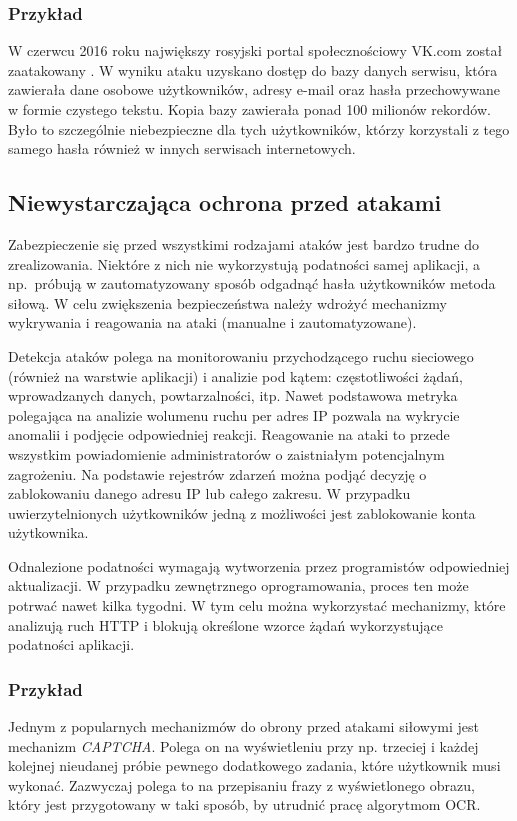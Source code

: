 \documentclass[11pt,a4paper,polish,thesis,oneside]{dcsbook}
\begin{document}
\subsubsection*{Przykład}
W czerwcu 2016 roku największy rosyjski portal społecznościowy VK.com został zaatakowany \cite{vk}. W wyniku ataku uzyskano dostęp do bazy danych serwisu, która zawierała dane osobowe użytkowników, adresy e-mail oraz hasła przechowywane w formie czystego tekstu. Kopia bazy zawierała ponad 100 milionów rekordów. Było to szczególnie niebezpieczne dla tych użytkowników, którzy korzystali z tego samego hasła również w innych serwisach internetowych. 


\subsection{Niewystarczająca ochrona przed atakami}
Zabezpieczenie się przed wszystkimi rodzajami ataków jest bardzo trudne do zrealizowania. Niektóre z nich nie wykorzystują podatności samej aplikacji, a np.~próbują w zautomatyzowany sposób odgadnąć hasła użytkowników metoda siłową. W celu zwiększenia bezpieczeństwa należy wdrożyć mechanizmy wykrywania i reagowania na ataki (manualne i zautomatyzowane).

Detekcja ataków polega na monitorowaniu przychodzącego ruchu sieciowego (również na warstwie aplikacji) i analizie pod kątem: częstotliwości żądań, wprowadzanych danych, powtarzalności, itp. Nawet podstawowa metryka polegająca na analizie wolumenu ruchu per adres IP pozwala na wykrycie anomalii i podjęcie odpowiedniej reakcji. Reagowanie na ataki to przede wszystkim powiadomienie administratorów o zaistniałym potencjalnym zagrożeniu. Na podstawie rejestrów zdarzeń można podjąć decyzję o zablokowaniu danego adresu IP lub całego zakresu. W przypadku uwierzytelnionych użytkowników jedną z możliwości jest zablokowanie konta użytkownika.

Odnalezione podatności wymagają wytworzenia przez programistów odpowiedniej aktualizacji. W przypadku zewnętrznego oprogramowania, proces ten może potrwać nawet kilka tygodni. W tym celu można wykorzystać mechanizmy, które analizują ruch HTTP i blokują określone wzorce żądań wykorzystujące podatności aplikacji.

\subsubsection*{Przykład}
Jednym z popularnych mechanizmów do obrony przed atakami siłowymi jest mechanizm \textit{CAPTCHA}. Polega on na wyświetleniu przy np. trzeciej i każdej kolejnej nieudanej próbie pewnego dodatkowego zadania, które użytkownik musi wykonać. Zazwyczaj polega to na przepisaniu frazy z wyświetlonego obrazu, który jest przygotowany w taki sposób, by utrudnić pracę algorytmom OCR. 
\end{document}
